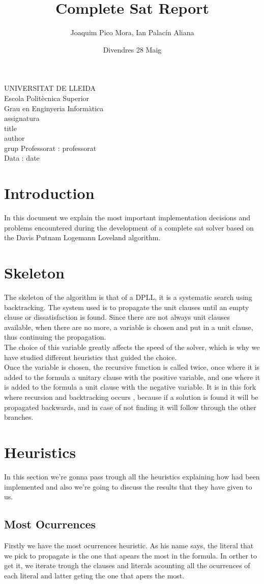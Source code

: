 \documentclass{article}
\title{Complete Sat Report}
\author{Joaquim Pico Mora, Ian Palacín Aliana}
\date{Divendres 28 Maig}
\renewcommand{\maketitle}{ %
	\begin{titlepage}
		\raggedright{UNIVERSITAT DE LLEIDA \\
			Escola Politècnica Superior \\
			Grau en Enginyeria Informàtica\\
			\1assignatura\\}
		\vspace{5cm}
		\centering\huge{\5title \\}
		\vspace{3cm}
		\large{\6author} \\
		\normalsize{\3grup}
		\vfill
		Professorat : \4professorat \\
		Data : \7date
\end{titlepage}}
\begin{document}
	\maketitle
	\thispagestyle{empty}


\section{Introduction}
In this document we explain the most important implementation decisions and problems
encountered during the development of a complete sat solver based on the Davis Putnam
Logemann Loveland algorithm.
%
\section{Skeleton}

The skeleton of the algorithm is that of a DPLL, it is a systematic search using backtracking.
The system used is to propagate the unit clauses until an empty clause  or
dissatisfaction is found. Since there are not always unit clauses available, when
there are no more, a variable is chosen and put in a unit clause, thus continuing the
propagation. \\

The choice of this variable greatly affects the speed of the solver, which is why we have studied
different heuristics that guided the choice. \\

Once the variable is chosen, the recursive function is called twice, once where it is added
to the formula a unitary clause with the positive variable, and one where it is added to the formula
a unit clause with the negative variable. It is in this fork where recursion and backtracking occurs
, because if a solution is found it will be propagated backwards, and in case of
not finding it will follow through the other branches.

%
\section{Heuristics}
In this section we're gonna pass trough all the heuristics explaining how had been implemented and also we're going to discuss the results that they have given to us. 
\subsection{Most Ocurrences}
Firstly we have the most ocurrences heuristic. As his name says, the literal that we pick to propagate is the one that apears the most in the formula. In orther to get it, we iterate trough the clauses and literals acounting all the ocurrences of each literal and latter geting the one that apers the most.
\end{document}
